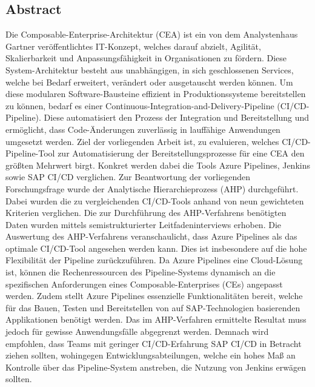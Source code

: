 \begin{center}
	\section*{Abstract}
\end{center}
Die Composable-Enterprise-Architektur (CEA) ist ein von dem Analystenhaus Gartner veröffentlichtes IT-Konzept, welches darauf abzielt, Agilität, Skalierbarkeit und Anpassungsfähigkeit in Organisationen zu fördern. Diese System-Architektur besteht aus unabhängigen, in sich geschlossenen Services, welche bei Bedarf erweitert, verändert oder ausgetauscht werden können. Um diese modularen Software-Bausteine effizient in Produktionssysteme bereitstellen zu können, bedarf es einer Continuous-Integration-and-Delivery-Pipeline (CI/CD-Pipeline). Diese automatisiert den Prozess der Integration und Bereitstellung und ermöglicht, dass Code-Änderungen zuverlässig in lauffähige Anwendungen umgesetzt werden.
Ziel der vorliegenden Arbeit ist, zu evaluieren, welches CI/CD-Pipeline-Tool zur Automatisierung der Bereitstellungsprozesse für eine CEA den größten Mehrwert birgt. Konkret werden dabei die Tools Azure Pipelines, Jenkins sowie SAP CI/CD verglichen. Zur Beantwortung der vorliegenden Forschungsfrage wurde der Analytische Hierarchieprozess (\acs{AHP}) durchgeführt. Dabei wurden die zu vergleichenden CI/CD-Tools anhand von neun gewichteten Kriterien verglichen. Die zur Durchführung des AHP-Verfahrens benötigten Daten wurden mittels semistrukturierter Leitfadeninterviews erhoben. Die Auswertung des AHP-Verfahrens veranschaulicht, dass Azure Pipelines als das optimale CI/CD-Tool angesehen werden kann. Dies ist insbesondere auf die hohe Flexibilität der Pipeline zurückzuführen. Da Azure Pipelines eine Cloud-Lösung ist, können die Rechenressourcen des Pipeline-Systems dynamisch an die spezifischen Anforderungen eines Composable-Enterprises (CEs) angepasst werden. Zudem stellt Azure Pipelines essenzielle Funktionalitäten bereit, welche für das Bauen, Testen und Bereitstellen von auf SAP-Technologien basierenden Applikationen benötigt werden. Das im AHP-Verfahren ermittelte Resultat muss jedoch für gewisse Anwendungsfälle abgegrenzt werden. Demnach wird empfohlen, dass Teams mit geringer CI/CD-Erfahrung SAP CI/CD in Betracht ziehen sollten, wohingegen Entwicklungsabteilungen, welche ein hohes Maß an Kontrolle über das Pipeline-System anstreben, die Nutzung von Jenkins erwägen sollten.  